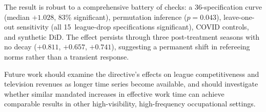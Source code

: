\documentclass[12pt]{article}
\begin{document}
The result is robust to a comprehensive battery of checks: a
36-specification curve (median $+1.028$, 83\% significant), permutation
inference ($p = 0.043$), leave-one-out sensitivity (all 15~league-drop
specifications significant), COVID controls, and synthetic DiD. The
effect persists through three post-treatment seasons with no decay
($+0.811$, $+0.657$, $+0.741$), suggesting a permanent shift in
refereeing norms rather than a transient response.

Future work should examine the directive's effects on league
competitiveness and television revenues as longer time series become
available, and should investigate whether similar mandated increases in
effective work time can achieve comparable results in other
high-visibility, high-frequency occupational settings.


\singlespacing



\clearpage

\end{document}
